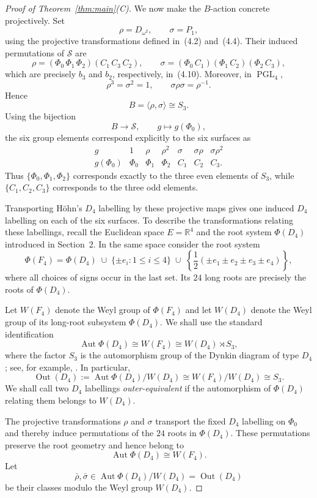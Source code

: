 \documentclass[10pt]{article}
\begin{document}
\begin{proof}[Proof of Theorem~\ref{thm:main}\textup{(C)}]
We now make the $B$-action concrete projectively.  Set
\[
\rho=D_{\omega^2},\qquad \sigma=P_1,
\]
using the projective transformations defined in~(4.2) and~(4.4).
Their induced permutations of $\mathcal S$ are
\[
\rho=(\Phi_0\,\Phi_1\,\Phi_2)(C_1\,C_3\,C_2),
\qquad
\sigma=(\Phi_0\,C_1)(\Phi_1\,C_2)(\Phi_2\,C_3),
\]
which are precisely $b_3$ and $b_2$, respectively, in~(4.10).
Moreover, in $\operatorname{PGL}_4$,
\[
\rho^3=\sigma^2=1,
\qquad
\sigma\rho\sigma=\rho^{-1}.
\]
Hence
\[
B=\langle\rho,\sigma\rangle\cong S_3.
\]
Using the bijection
\[
B\longrightarrow\mathcal S,\qquad g\longmapsto g(\Phi_0),
\]
the six group elements correspond explicitly to the six surfaces as
\[
\begin{array}{c|cccccc}
g
   &1&\rho&\rho^2&\sigma&\sigma\rho&\sigma\rho^2\\
\hline
g(\Phi_0)
   &\Phi_0&\Phi_1&\Phi_2&C_1&C_2&C_3 .
\end{array}
\]
Thus $\{\Phi_0,\Phi_1,\Phi_2\}$ corresponds exactly to the three even
elements of $S_3$, while $\{C_1,C_2,C_3\}$ corresponds to the three odd
elements.

Transporting H\"ohn's $D_4$ labelling by these projective maps gives one
induced $D_4$ labelling on each of the six surfaces.  To describe the
transformations relating these labellings, recall the Euclidean space
$E=\mathbb R^4$ and the root system $\Phi(D_4)$ introduced in Section~2. In the same space consider the root system
\[
\Phi(F_4)
=
\Phi(D_4)
\;\cup\;
\{\pm e_i:1\leq i\leq4\}
\;\cup\;
\left\{
\frac12(\pm e_1\pm e_2\pm e_3\pm e_4)
\right\},
\]
where all choices of signs occur in the last set.  Its $24$ long roots
are precisely the roots of $\Phi(D_4)$.

Let $W(F_4)$ denote the Weyl group of $\Phi(F_4)$ and let $W(D_4)$
denote the Weyl group of its long-root subsystem $\Phi(D_4)$.  We shall
use the standard identification
\[
\operatorname{Aut}\Phi(D_4)
   \cong W(F_4)
   \cong W(D_4)\rtimes S_3,
\]
where the factor $S_3$ is the automorphism group of the Dynkin diagram
of type $D_4$; see, for example,
\cite{BourbakiLie,Koca03}.  In particular,
\[
\operatorname{Out}(D_4)
:=
\operatorname{Aut}\Phi(D_4)/W(D_4)
\cong
W(F_4)/W(D_4)
\cong S_3.
\tag{4.12}
\]
We shall call two $D_4$ labellings \emph{outer-equivalent} if the
automorphism of $\Phi(D_4)$ relating them belongs to $W(D_4)$.

The projective transformations $\rho$ and $\sigma$ transport the fixed
$D_4$ labelling on $\Phi_0$ and thereby induce permutations of the
$24$ roots in $\Phi(D_4)$.  These permutations preserve the root
geometry and hence belong to
\[
\operatorname{Aut}\Phi(D_4)\cong W(F_4).
\]
Let
\[
\bar\rho,\bar\sigma\in
\operatorname{Aut}\Phi(D_4)/W(D_4)
=
\operatorname{Out}(D_4)
\]
be their classes modulo the Weyl group $W(D_4)$.


\end{proof}
\end{document}
